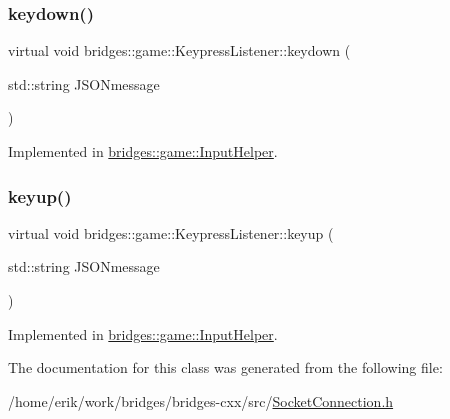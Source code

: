 \subsubsection{\texorpdfstring{keydown()}{keydown()}}
{\footnotesize\ttfamily virtual void bridges\+::game\+::\+Keypress\+Listener\+::keydown (\begin{DoxyParamCaption}\item[{std\+::string}]{J\+S\+O\+Nmessage }\end{DoxyParamCaption})\hspace{0.3cm}{\ttfamily [pure virtual]}}



Implemented in \hyperlink{classbridges_1_1game_1_1_input_helper_aac75c2b1abf28afa4acaf730e925f301}{bridges\+::game\+::\+Input\+Helper}.

\mbox{\label{classbridges_1_1game_1_1_keypress_listener_a21d9f085819e30c41f3964ea2276964d}} 
\subsubsection{\texorpdfstring{keyup()}{keyup()}}
{\footnotesize\ttfamily virtual void bridges\+::game\+::\+Keypress\+Listener\+::keyup (\begin{DoxyParamCaption}\item[{std\+::string}]{J\+S\+O\+Nmessage }\end{DoxyParamCaption})\hspace{0.3cm}{\ttfamily [pure virtual]}}



Implemented in \hyperlink{classbridges_1_1game_1_1_input_helper_aa847f19c6f68ebbb63d73802abfcd9a0}{bridges\+::game\+::\+Input\+Helper}.



The documentation for this class was generated from the following file\+:\begin{DoxyCompactItemize}
\item 
/home/erik/work/bridges/bridges-\/cxx/src/\hyperlink{_socket_connection_8h}{Socket\+Connection.\+h}\end{DoxyCompactItemize}
